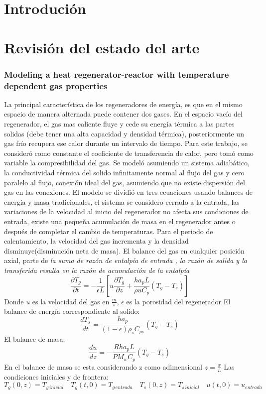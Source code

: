\documentclass[12pt,letterpaper,final]{article}%
\begin{document}
\section{Introduci\'on}

\section{Revisión del estado del arte}
\subsubsection*{Modeling a heat regenerator-reactor with temperature dependent gas properties}
La principal característica de los regeneradores de energía, es que en el mismo espacio de manera alternada puede contener dos gases. En el espacio vacío del regenerador, el gas mas caliente fluye y cede su energía térmica a las partes solidas (debe tener una alta capacidad y densidad térmica), posteriormente un gas frío recupera ese calor durante un intervalo de tiempo. Para este trabajo, se consideró como constante el coeficiente de transferencia de calor, pero tomó como variable la compresibilidad del gas. Se modeló asumiendo un sistema adiabático, la conductividad térmica del solido infinitamente normal al flujo del gas y cero paralelo al flujo, conexión ideal del gas, asumiendo que no existe dispersión del gas en las conexiones. El modelo se dividió en tres ecuaciones usando balances de energía y masa tradicionales, el sistema se considero cerrado a la entrada, las variaciones de la velocidad al inicio del regenerador no afecta sus condiciones de entrada, existe una pequeña acumulación de masa en el regenerador antes o después de completar el cambio de temperaturas. Para el periodo de calentamiento, la velocidad del gas incrementa y la densidad disminuye(disminución neta de masa). El balance del gas en cualquier posición axial, parte de \textit{la suma de razón de entalpía de entrada , la razón de salida y la transferida resulta en la razón de acumulación de la entalpía}\cite{Kulkarni1992} 
\begin{equation}
	\frac{\partial T_g}{\partial t} = -\frac{1}{\epsilon L}[u\frac{\partial T_g}{\partial z}+ \frac{ha_p L}{\rho u C_p}(T_g-T_s)]
\end{equation}
Donde $u$ es la velocidad del gas en $\frac{m}{s}$, $\epsilon$ es la porosidad del regenerador
\newline
El balance de energía correspondiente al solido:
\begin{equation}
	\frac{dT_s}{dt} = \frac{ha_p}{(1-\epsilon)\rho_s C_{ps}}(T_g-T_s)
\end{equation}
El balance de masa:
\begin{equation}
	\frac{du}{dz} = -\frac{Rha_pL}{PM_wC_p}(T_g-T_s)
\end{equation}
En el balance de masa se esta considerando z como adimensional $z=\frac{x}{L}$
\newline
Las condiciones iniciales y de frontera:
\begin{equation*}
	T_g(0,z)=T_{g \,inicial} \quad T_g(t,0)=T_{g \,entrada} \quad T_s(0,z)= T_{s \, inicial} \quad u(t,0) = u_{entrada}
\end{equation*}
\end{document}
